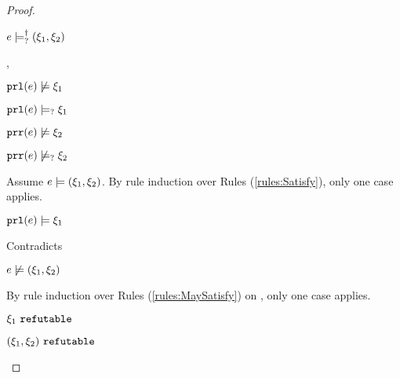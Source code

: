 \begin{proof}
\begin{byCases}
\begin{byCases}
\begin{byCases}
\begin{byCases}
\begin{pfsteps*}
                \item $e \models_{?}^{\dag} (\xi_1 , \xi_2)$ 
                \end{pfsteps*}
            \end{byCases}
        \item[\cmaysatisfy{\hprl{e}}{\xi_1},\cnotsatisfyormay{\hprr{e}}{\xi_2}]
            \begin{pfsteps*}
            \item $\mathtt{prl}(e) \not\models \xi_1$  
            \item $\mathtt{prl}(e) \models_{?} \xi_1$  
            \item $\mathtt{prr}(e) \not\models \xi_2$  
            \item $\mathtt{prr}(e) \not\models_{?} \xi_2$  
            \end{pfsteps*}
            Assume $e \models (\xi_1 , \xi_2)$. By rule induction over Rules (\ref{rules:Satisfy}), only one case applies.
            \begin{byCases}
            \item[\text{(\ref{rule:CSNotValPair})}]
                \begin{pfsteps*}
                \item $\mathtt{prl}(e) \models \xi_1$ 
                \end{pfsteps*}
                Contradicts 
            \end{byCases}
            \begin{pfsteps*}
            \item $e \not\models (\xi_1 , \xi_2)$  
            \end{pfsteps*}
            By rule induction over Rules (\ref{rules:MaySatisfy}) on , only one case applies. 
            \begin{byCases}
            \item[\text{(\ref{rule:CMSNotVal})}]
                \begin{pfsteps*}
                \item $\xi_1 ~\mathtt{refutable}$  
                \item $(\xi_1 , \xi_2) ~\mathtt{refutable}$  

\end{pfsteps*}
\end{byCases}
\end{byCases}
\end{byCases}
\end{byCases}
\end{proof}
